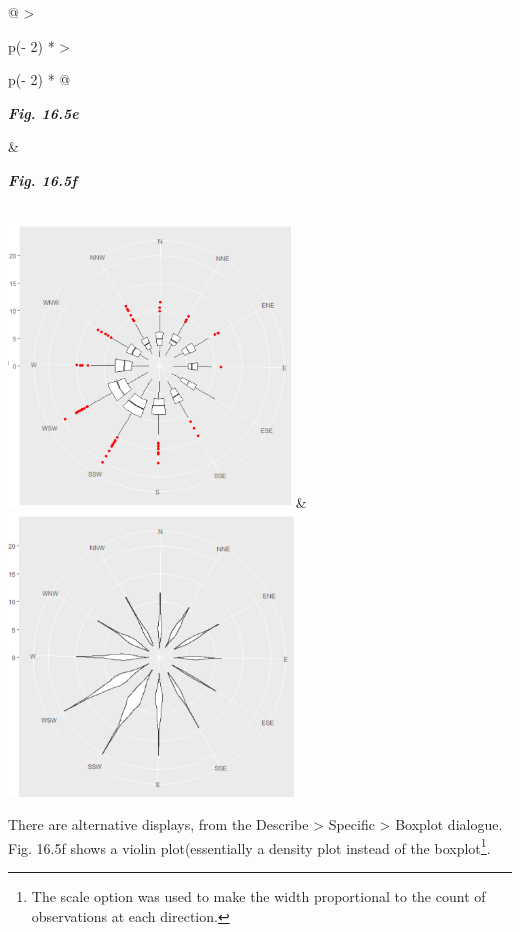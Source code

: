 \documentclass[
  letterpaper,
  DIV=11,
  numbers=noendperiod]{scrreprt}
\begin{document}
\begin{longtable}[]{@{}
  >{\raggedright\arraybackslash}p{(\columnwidth - 2\tabcolsep) * }
  >{\raggedright\arraybackslash}p{(\columnwidth - 2\tabcolsep) * }@{}}
\toprule\noalign{}
\begin{minipage}[b]{\linewidth}\raggedright
\textbf{\emph{Fig. 16.5e}}
\end{minipage} & \begin{minipage}[b]{\linewidth}\raggedright
\textbf{\emph{Fig. 16.5f}}
\end{minipage} \\
\midrule\noalign{}
\endhead
\bottomrule\noalign{}
\endlastfoot
\includegraphics[width=2.94854in,height=2.95557in]{figures/Fig16.5e.png}
&
\includegraphics[width=2.97646in,height=2.95877in]{figures/Fig16.5f.png} \\
\end{longtable}

There are alternative displays, from the Describe \textgreater{}
Specific \textgreater{} Boxplot dialogue. Fig. 16.5f shows a violin
plot(essentially a density plot instead of the boxplot\footnote{The
  scale option was used to make the width proportional to the count of
  observations at each direction.}.
\end{document}
